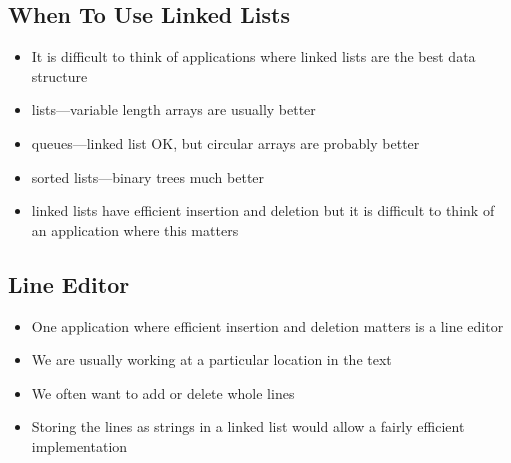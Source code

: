 \begin{slide}
\section{When To Use Linked Lists}

\begin{PauseHighLight}
  \begin{itemize}
  \item It is difficult to think of applications where linked lists are
    the best data structure\pause
  \item lists---variable length arrays are usually better\pause
  \item queues---linked list OK, but circular arrays are probably better\pause
  \item sorted lists---binary trees much better\pause
  \item linked lists have efficient insertion and deletion but it is
    difficult to think of an application where this matters\pause
  \end{itemize}
\end{PauseHighLight}
\end{slide}


\begin{slide}
\section{Line Editor}

\begin{PauseHighLight}
  \begin{itemize}
  \item One application where efficient insertion and deletion matters
    is a line editor\pause
  \item We are usually working at a particular location in the
    text\pause
  \item We often want to add or delete whole lines\pause
  \item Storing the lines as strings in a linked list would allow a
    fairly efficient implementation\pause
  \end{itemize}
\end{PauseHighLight}
\end{slide}

\Outline

